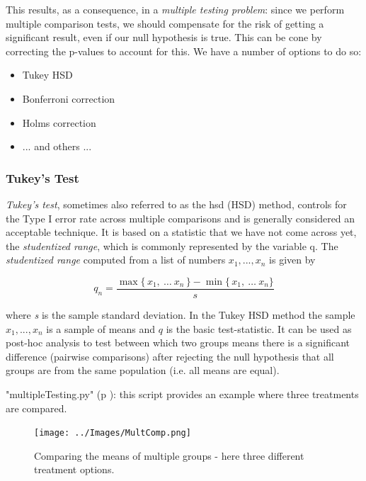 This results, as a consequence, in a \emph{multiple testing problem}:
since we perform multiple comparison tests, we should compensate for the risk of getting a significant result, even if our null hypothesis is true. This can be cone by correcting the p-values to account for this. We have a number of options to do so:

\begin{itemize}
  \item Tukey HSD
  \item Bonferroni correction
  \item Holms correction
  \item ... and others ...
\end{itemize}


\subsubsection{Tukey's Test}

\emph{Tukey's test}, sometimes also referred to as the \acrfull{hsd} (HSD) method, controls for the Type I error rate across multiple comparisons and is generally considered an acceptable technique. It is based on a
statistic that we have not come across yet, the \emph{studentized range}, which is commonly represented by the variable q. The \emph{studentized range} computed from a list of numbers $x_1, ..., x_n$ is given by

\begin{equation}
  q _{n}= \frac{\max\{\,x_1,\ \dots \ x_n\,\} - \min\{\,x_1,\ \dots\ x_n\}}{s}
\end{equation}

where \emph{s} is the sample standard deviation.
In the Tukey HSD method the sample $x_1, ..., x_n$ is a sample of means and $q$ is the basic test-statistic. It can be used as post-hoc analysis to test between which two groups means there is a significant difference (pairwise comparisons) after rejecting the null hypothesis that all groups are from the same population (i.e. all means are equal).

\PyImg "multipleTesting.py" (p \pageref{py:multipleTesting}): this script provides an example where three treatments are compared.

\begin{figure}
  \centering
  \texttt{[image: ../Images/MultComp.png]}\\
  \caption{Comparing the means of multiple groups - here three different treatment options.}
\end{figure}

